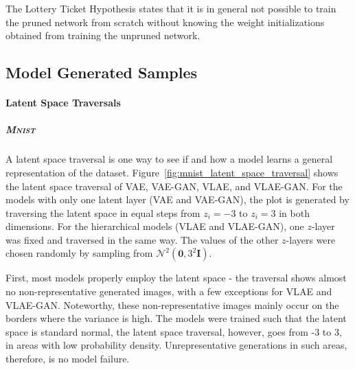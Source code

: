 The Lottery Ticket Hypothesis states that it is in general not possible to train the pruned network from scratch without knowing the weight initializations obtained from training the unpruned network.

\subsection{Model Generated Samples}

\paragraph{Latent Space Traversals}

\subparagraph{\textsc{Mnist}}

A latent space traversal is one way to see if and how a model learns a general representation of the dataset.
Figure~\ref{fig:mnist_latent_space_traversal} shows the latent space traversal of \ac{VAE}, \ac{VAE}-\ac{GAN}, \ac{VLAE}, and \ac{VLAE}-\ac{GAN}.
For the models with only one latent layer (\ac{VAE} and \ac{VAE}-\ac{GAN}), the plot is generated by traversing the latent space in equal steps from $z_i = -3$ to $z_i = 3$ in both dimensions.
For the hierarchical models (\ac{VLAE} and \ac{VLAE}-\ac{GAN}), one $z$-layer was fixed and traversed in the same way.
The values of the other $z$-layers were chosen randomly by sampling from $\mathcal{N}^2(\bm{0}, 3^2\bm{I})$.

First, most models properly employ the latent space - the traversal shows almost no non-representative generated images, with a few exceptions for \ac{VLAE} and \ac{VLAE}-\ac{GAN}.
Noteworthy, these non-representative images mainly occur on the borders where the variance is high.
The models were trained such that the latent space is standard normal, the latent space traversal, however, goes from -3 to 3, in areas with low probability density.
Unrepresentative generations in such areas, therefore, is no model failure.

